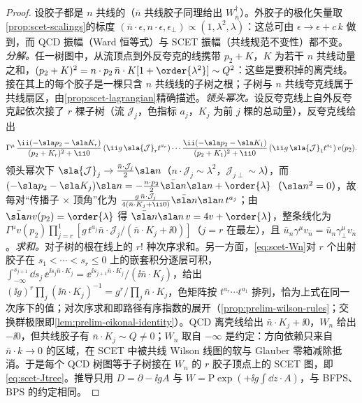 \begin{proof}
设胶子都是 $n$ 共线的（$\bar n$ 共线胶子同理给出 $W_{\bar n}^\dagger$）。外胶子的极化矢量取\cref{prop:scet-scalings}的标度 $(\bar n\cdot\epsilon,n\cdot\epsilon,\epsilon_\perp)\propto(1,\lambda^2,\lambda)$：这总可由 $\epsilon\to\epsilon+c\,k$ 做到，而 QCD 振幅（Ward 恒等式）与 SCET 振幅（共线规范不变性）都不变。\emph{分解。}任一树图中，从流顶点到外反夸克的线携带 $p_2+K$，$K$ 为若干 $n$ 共线动量之和，$(p_2+K)^2=n\cdot p_2\,\bar n\cdot K[1+\order{\lambda^2}]\sim Q^2$：这些是要积掉的离壳线。接在其上的每个胶子是一棵只含 $n$ 共线线的子树之根；子树与 $n$ 共线夸克线属于共线扇区，由\cref{prop:scet-lagrangian}精确描述。\emph{领头幂次。}设反夸克线上自外反夸克起依次接了 $r$ 棵子树（流 $\mathcal J_j$，色指标 $a_j$，$K_j$ 为前 $j$ 棵的总动量），反夸克线给出
\[
\Gamma^\mu\,\frac{\ii(-\sla p_2-\sla K_r)}{(p_2+K_r)^2+\ii0}\,(\ii g\,\sla{\mathcal J}_r t^{a_r})\cdots\frac{\ii(-\sla p_2-\sla K_1)}{(p_2+K_1)^2+\ii0}\,(\ii g\,\sla{\mathcal J}_1t^{a_1})\,v(p_2).
\]
领头幂次下 $\sla{\mathcal J}_j\to\frac{\bar n\cdot\mathcal J_j}{2}\sla n$（$n\cdot\mathcal J_j\sim\lambda^2$，$\mathcal J_{j\perp}\sim\lambda$），而 $(-\sla p_2-\sla K_j)\sla n=-\frac{n\cdot p_2}{2}\bar{\sla n}\sla n+\order{\lambda}$（$\sla n^2=0$），故每对“传播子 × 顶角”化为 $\frac{g\,\bar n\cdot\mathcal J_j}{4(\bar n\cdot K_j+\ii0)}\bar{\sla n}\sla n\,t^{a_j}$；由 $\bar{\sla n}v(p_2)=\order{\lambda}$ 得 $\bar{\sla n}\sla n\,v=4v+\order{\lambda}$，整条线化为 $\Gamma^\mu v(p_2)\prod_{j=r}^{1}[g\,t^{a_j}\bar n\cdot\mathcal J_j/(\bar n\cdot K_j+\ii0)]$（$j=r$ 在最左），且 $\bar u_n\gamma^\mu v_{\bar n}=\bar u_n\gamma_\perp^\mu v_{\bar n}$。\emph{求和。}对子树的根在线上的 $r!$ 种次序求和。另一方面，\cref{eq:scet-Wn}对 $r$ 个出射胶子在 $s_1<\cdots<s_r\le0$ 上的嵌套积分逐层可积，$\int_{-\infty}^{s_{j+1}}\dd s_j\,\ee^{\ii s_j\bar n\cdot K_j}=\ee^{\ii s_{j+1}\bar n\cdot K_j}/(\ii\bar n\cdot K_j)$，给出 $(\ii g)^r\prod_j(\ii\bar n\cdot K_j)^{-1}=g^r/\prod_j\bar n\cdot K_j$，色矩阵按 $t^{a_r}\cdots t^{a_1}$ 排列，恰为上式在同一次序下的值；对次序求和即路径有序指数的展开（\cref{prop:prelim-wilson-rules}；交换群极限即\cref{lem:prelim-eikonal-identity}）。QCD 离壳线给出 $\bar n\cdot K_j+\ii0$，$W_n$ 给出 $-\ii0$，但共线胶子有 $\bar n\cdot K_j\sim Q\neq0$；$W_n$ 取自 $-\infty$ 是约定：方向依赖只来自 $\bar n\cdot k\to0$ 的区域，在 SCET 中被共线 Wilson 线图的软与 Glauber 零箱减除抵消\cite[第~4.2~节]{RothsteinStewart2016}。于是每个 QCD 树图等于子树接在 $W_n$ 的 $r$ 胶子顶点上的 SCET 图，即\cref{eq:scet-Jtree}。推导只用 $D=\partial-\ii gA$ 与 $W=\mathrm P\exp(+\ii g\int\dd z\cdot A)$，与 BFPS、BPS 的约定相同。
\end{proof}

